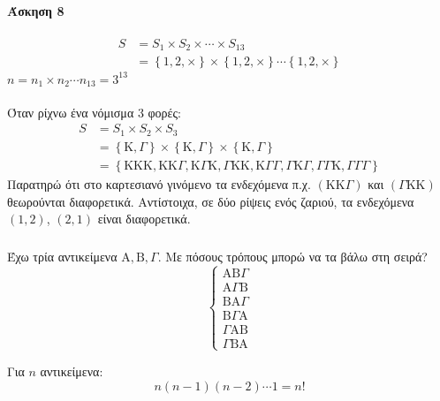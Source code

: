 \documentclass[11pt,a4paper,titlepage,draft]{article}
\begin{document}
\paragraph{Άσκηση 8}
\begin{align*}
S &= S_1 \times S_2 \times \cdots \times S_{13} \\
&=
 \left\lbrace 1,2,\times \right\rbrace
 \times
  \left\lbrace 1,2,\times \right\rbrace
  \cdots
   \left\lbrace 1,2,\times \right\rbrace
\end{align*}
\(n=n_1\times n_2 \cdots n_{13}=3^{13}\)

\paragraph{}
Όταν ρίχνω ένα νόμισμα 3 φορές:
\begin{align*}
S &= S_1 \times S_2 \times S_3 \\
&=  \left\lbrace \mathrm K, \Gamma   \right\rbrace \times  \left\lbrace \mathrm K, \Gamma  \right\rbrace\times \left\lbrace \mathrm K, \Gamma  \right\rbrace \\
&=
 \left\lbrace
 \mathrm K\mathrm K\mathrm K,
 \mathrm K\mathrm K \Gamma ,
 \mathrm K \Gamma \mathrm K,
  \Gamma \mathrm K\mathrm K,
  \mathrm K \Gamma  \Gamma ,
   \Gamma \mathrm K \Gamma ,
    \Gamma  \Gamma \mathrm K,
     \Gamma  \Gamma  \Gamma
  \right\rbrace
\end{align*}
Παρατηρώ ότι στο καρτεσιανό γινόμενο τα ενδεχόμενα π.χ. \((\mathrm K \mathrm K  \Gamma)\) και \((\Gamma \mathrm K \mathrm  K)\) θεωρούνται διαφορετικά. Αντίστοιχα, σε δύο ρίψεις ενός ζαριού, τα ενδεχόμενα \( (1,2)\), \((2,1)\) είναι διαφορετικά.

\subsubsection{}
Έχω τρία αντικείμενα \(\mathrm A, \mathrm B , \Gamma \). Με πόσους τρόπους μπορώ να τα βάλω στη σειρά?
\[
\begin{cases}
 \mathrm A \mathrm B  \Gamma \\
  \mathrm A \Gamma  \mathrm B \\
     \mathrm B   \mathrm A \Gamma \\
   \mathrm B  \Gamma  \mathrm A\\
    \Gamma  \mathrm A \mathrm B \\
     \Gamma  \mathrm B  \mathrm A
\end{cases}
\]

Για \(n\) αντικείμενα:
\[
n(n-1)(n-2)\cdots 1 = n!
\]
\end{document}
